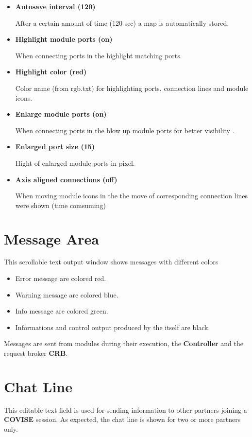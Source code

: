 \begin{itemize}
   \item{\bf Autosave interval (120)}
   
   After a certain amount of time (120 sec) a map is automatically stored.
   
   \item{\bf Highlight module ports (on)}
   
   When connecting ports in the {\mycanvas} highlight matching ports.
   
   \item{\bf Highlight color (red)}
   
   Color name (from rgb.txt) for highlighting ports, connection lines and module icons.
   
   \item{\bf Enlarge module ports (on)}
   
   When connecting ports in the {\mycanvas} blow up module ports for better visibility .
   
   \item{\bf Enlarged port size (15)}
   
   Hight of enlarged module ports in pixel.
   
   \item{\bf Axis aligned connections (off)}
   
   When moving module icons in the {\mycanvas} the move of corresponding connection lines were shown (time comsuming)
   
   
   \end{itemize}



	
	 \section{Message Area}
    \label{message}


	 This scrollable text output window shows messages with different colors
	 \begin{itemize}
	 \item Error message are colored red.
	 \item Warning message are colored blue.
	 \item Info message are colored green.
	 \item Informations and control output produced by the {\mapeditor} itself are black.
	 \end{itemize}
    
	 Messages are sent from modules during their execution, the {\bf Controller} and the 
    request broker {\bf CRB}.





	 \section{Chat Line}
    \label{chat}


	 This editable text field is used for sending information to other partners joining a {\bf COVISE}  
    session. As expected, the chat line is shown for two or more partners only.  
    

